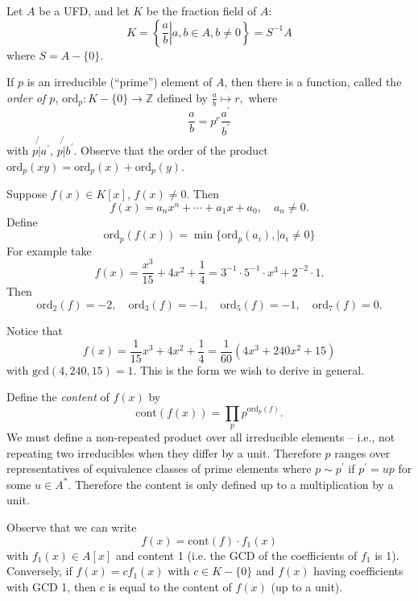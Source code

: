 Let $A$ be a UFD, and let $K$ be the fraction field of $A$:
$$
K = \left\{ \left. \frac{a}{b} \right| a, b \in A, b \neq 0 \right\}
  = S^{-1} A
$$
where $S = A - \{ 0 \}$.

If $p$ is an irreducible (``prime'') element of $A$, then there is a
function, called the \emph{order of $p$},
$\mathrm{ord}_p : K - \{ 0 \} \to \mathbb{Z}$ defined by
$\frac{a}{b} \mapsto r,$
where
$$
\frac{a}{b} = p^r \frac{a^\prime}{b^\prime}
$$
with $p \not{\vert} a^\prime$, $p \not{\vert} b^\prime$. Observe that the
order of the product
$\mathrm{ord}_p(xy) = \mathrm{ord}_p(x) + \mathrm{ord}_p(y)$.

Suppose $f(x) \in K[x]$, $f(x) \neq 0$. Then
$$
f(x) = a_n x^n + \cdots + a_1 x + a_0, \quad a_n \neq 0.
$$
Define
$$
\mathrm{ord}_p(f(x)) = \min \{
                               \mathrm{ord}_p(a_i),
                            \mid
                               a_i \neq 0
                            \}
$$
For example take
$$
f(x) = \frac{x^3}{15} + 4x^2 + \frac{1}{4}
     = 3^{-1} \cdot 5^{-1} \cdot x^3 + 2^{-2} \cdot 1.
$$
Then
$$
\mathrm{ord}_2(f) = -2, \quad
\mathrm{ord}_3(f) = -1, \quad
\mathrm{ord}_5(f) = -1, \quad
\mathrm{ord}_7(f) = 0.
$$

Notice that
$$
f(x) = \frac{1}{15} x^3 + 4x^2 + \frac{1}{4}
     = \frac{1}{60} (4x^3 + 240x^2 + 15)
$$
with $\mathrm{gcd}(4, 240, 15) = 1$. This is the form we wish to
derive in general.

Define the \emph{content} of $f(x)$ by
$$
\mathrm{cont}(f(x)) = \prod_p p^{\mathrm{ord}_p(f)}.
$$
We must define a non-repeated product over all irreducible elements
-- i.e., not repeating two irreducibles when they differ by a
unit. Therefore $p$ ranges over representatives of equivalence classes
of prime elements where $p \sim p^\prime$ if $p^\prime = u p$ for some
$u \in A^\ast$. Therefore the content is only defined up to a
multiplication by a unit.

Observe that we can write
$$
f(x) = \mathrm{cont}(f) \cdot f_1(x)
$$
with $f_1(x) \in A[x]$ and content 1 (i.e. the GCD of the coefficients
of $f_1$ is 1). Conversely, if $f(x) = c f_1(x)$ with $c \in K - \{ 0
\}$ and $f(x)$ having coefficients with GCD 1, then $c$ is equal to
the content of $f(x)$ (up to a unit).

